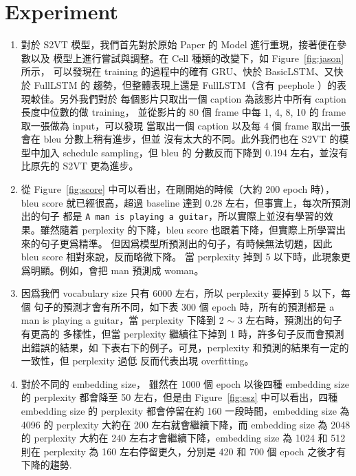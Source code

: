 \documentclass[12pt, a4paper]{article}
\theoremstyle{mystyle}	%
\begin{document}
\section{Experiment}
\begin{enumerate}
\item  對於 S2VT 模型，我們首先對於原始 Paper 的 Model 進行重現，接著便在參數以及
模型上進行嘗試與調整。在 Cell 種類的改變下，如 Figure~\ref{fig:jason} 所示，
可以發現在 training 的過程中的確有 GRU、快於 BasicLSTM、又快於 FullLSTM 的
趨勢，但整體表現上還是 FullLSTM（含有 peephole ）的表現較佳。另外我們對於
每個影片只取出一個 caption 為該影片中所有 caption 長度中位數的做 training，
並從影片的 80 個 frame 中每 1, 4, 8, 10 的 frame 取一張做為 input，可以發現
當取出一個 caption 以及每 4 個 frame 取出一張會在 bleu 分數上稍有進步，但並
沒有太大的不同。此外我們也在 S2VT 的模型中加入 schedule sampling，但 bleu 的
分數反而下降到 0.194 左右，並沒有比原先的 S2VT 更為進步。
\item 從 Figure~\ref{fig:score} 中可以看出，在剛開始的時候（大約 200 epoch 時），
  bleu score 就已經很高，超過 baseline 達到 0.28 左右，但事實上，每次所預測出的句子
  都是 \texttt{A man is playing a guitar}，所以實際上並沒有學習的效果。雖然隨着
  perplexity 的下降，bleu score 也跟着下降，但實際上所學習出來的句子更爲精準。
  但因爲模型所預測出的句子，有時候無法切題，因此 bleu score 相對來說，反而略微下降。
  當 perplexity 掉到 5 以下時，此現象更爲明顯。例如，會把 man 預測成 woman。
\item 因爲我們 vocabulary size 只有 6000 左右，所以 perplexity 要掉到 5 以下，每個
  句子的預測才會有所不同，如下表 300 個 epoch 時，所有的預測都是 a man is 
  playing a guitar，當 perplexity 下降到 2 $\sim$ 3 左右時，預測出的句子有更高的
  多樣性，但當 perplexity 繼續往下掉到 1 時，許多句子反而會預測出錯誤的結果，如
  下表右下的例子。可見，perplexity 和預測的結果有一定的一致性，但 perplexity 過低
  反而代表出現 overfitting。 
\item 對於不同的 embedding size， 雖然在 1000 個 epoch 以後四種 embedding size 的
  perplexity 都會降至 50 左右，但是由 Figure~\ref{fig:esz} 中可以看出，四種 embedding size 的 
  perplexity 都會停留在約 160 一段時間，embedding size 為 4096 的 perplexity
  大約在 200 左右就會繼續下降，而 embedding size 為 2048 的 perplexity 大約在
  240 左右才會繼續下降，embedding size 為 1024 和 512 則在 perplexity 為 160 
  左右停留更久，分別是 420 和 700 個 epoch 之後才有下降的趨勢.
\end{enumerate}
\end{document}
